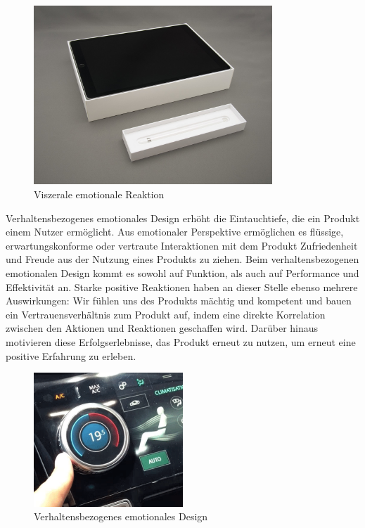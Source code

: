 \documentclass[./dokumentation.tex]{subfiles}
\begin{document}
\begin{figure}[H]
    \centering
    \includegraphics[width=0.8\textwidth]{bilder/ipadbox.jpg}
    \caption{Viszerale emotionale Reaktion\cite*{ipadbox}}
    \label{fig1:visc}
\end{figure}


Verhaltensbezogenes emotionales Design erhöht die Eintauchtiefe, die ein Produkt einem Nutzer ermöglicht. Aus emotionaler Perspektive ermöglichen es flüssige, erwartungskonforme oder vertraute Interaktionen mit dem Produkt Zufriedenheit und Freude aus der Nutzung eines Produkts zu ziehen. Beim verhaltensbezogenen emotionalen Design kommt es sowohl auf Funktion, als auch auf Performance und Effektivität an.
Starke positive Reaktionen haben an dieser Stelle ebenso mehrere Auswirkungen: Wir fühlen uns des Produkts mächtig und kompetent und bauen ein Vertrauensverhältnis zum Produkt auf, indem eine direkte Korrelation zwischen den Aktionen und Reaktionen geschaffen wird. Darüber hinaus motivieren diese Erfolgserlebnisse, das Produkt erneut zu nutzen, um erneut eine positive Erfahrung zu erleben\cite{medium_muz}.\pagebreak


\begin{figure}[H]
    \centering
    \includegraphics[width=0.5\textwidth]{bilder/verh-bez-des.png}
    \caption{Verhaltensbezogenes emotionales Design \cite{medium_muz}}
    \label{fig2:verh}
\end{figure}\\
\end{document}
